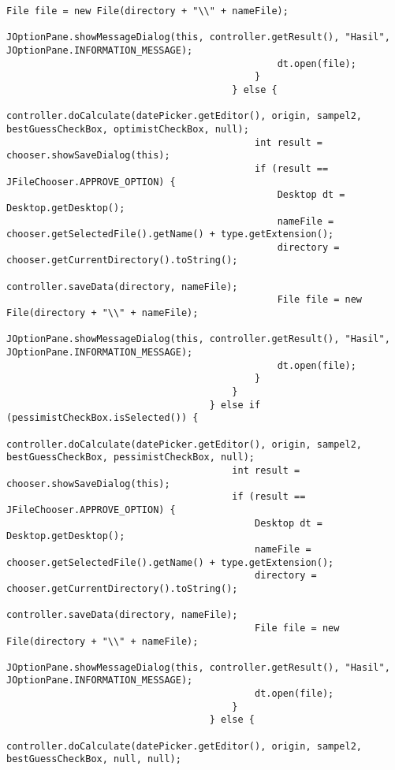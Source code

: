 \begin{lstlisting}[caption= main.java]
                                                File file = new File(directory + "\\" + nameFile);
                                                JOptionPane.showMessageDialog(this, controller.getResult(), "Hasil", JOptionPane.INFORMATION_MESSAGE);
                                                dt.open(file);
                                            }
                                        } else {
                                            controller.doCalculate(datePicker.getEditor(), origin, sampel2, bestGuessCheckBox, optimistCheckBox, null);
                                            int result = chooser.showSaveDialog(this);
                                            if (result == JFileChooser.APPROVE_OPTION) {
                                                Desktop dt = Desktop.getDesktop();
                                                nameFile = chooser.getSelectedFile().getName() + type.getExtension();
                                                directory = chooser.getCurrentDirectory().toString();
                                                controller.saveData(directory, nameFile);
                                                File file = new File(directory + "\\" + nameFile);
                                                JOptionPane.showMessageDialog(this, controller.getResult(), "Hasil", JOptionPane.INFORMATION_MESSAGE);
                                                dt.open(file);
                                            }
                                        }
                                    } else if (pessimistCheckBox.isSelected()) {
                                        controller.doCalculate(datePicker.getEditor(), origin, sampel2, bestGuessCheckBox, pessimistCheckBox, null);
                                        int result = chooser.showSaveDialog(this);
                                        if (result == JFileChooser.APPROVE_OPTION) {
                                            Desktop dt = Desktop.getDesktop();
                                            nameFile = chooser.getSelectedFile().getName() + type.getExtension();
                                            directory = chooser.getCurrentDirectory().toString();
                                            controller.saveData(directory, nameFile);
                                            File file = new File(directory + "\\" + nameFile);
                                            JOptionPane.showMessageDialog(this, controller.getResult(), "Hasil", JOptionPane.INFORMATION_MESSAGE);
                                            dt.open(file);
                                        }
                                    } else {
                                        controller.doCalculate(datePicker.getEditor(), origin, sampel2, bestGuessCheckBox, null, null);


\end{lstlisting}
